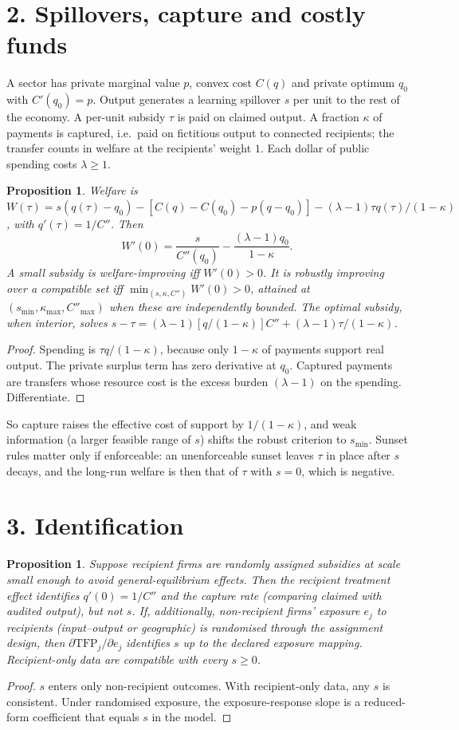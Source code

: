 \documentclass[11pt]{article}
\newtheorem{proposition}[theorem]{Proposition}
\theoremstyle{definition}
\begin{document}
\section*{2. Spillovers, capture and costly funds}
A sector has private marginal value $p$, convex cost $C(q)$ and private optimum $q_0$ with $C'(q_0)=p$. Output generates a
learning spillover $s$ per unit to the rest of the economy. A per-unit subsidy $\tau$ is paid on claimed output. A fraction
$\kappa$ of payments is captured, i.e.\ paid on fictitious output to connected recipients; the transfer counts in welfare at
the recipients' weight $1$. Each dollar of public spending costs $\lambda\ge1$.
\begin{proposition}\label{prop:thr}
Welfare is
$W(\tau)=s(q(\tau)-q_0)-[C(q)-C(q_0)-p(q-q_0)]-(\lambda-1)\tau q(\tau)/(1-\kappa)$, with $q'(\tau)=1/C''$. Then
\[
 W'(0)=\frac{s}{C''(q_0)}-\frac{(\lambda-1)q_0}{1-\kappa}.
\]
A small subsidy is welfare-improving iff $W'(0)>0$. It is robustly improving over a compatible set iff
$\min_{(s,\kappa,C'')}W'(0)>0$, attained at $(s_{\min},\kappa_{\max},C''_{\max})$ when these are independently bounded.
The optimal subsidy, when interior, solves $s-\tau=(\lambda-1)[q/(1-\kappa)]C''+(\lambda-1)\tau/(1-\kappa)$.
\end{proposition}
\begin{proof}
Spending is $\tau q/(1-\kappa)$, because only $1-\kappa$ of payments support real output. The private surplus term has zero
derivative at $q_0$. Captured payments are transfers whose resource cost is the excess burden $(\lambda-1)$ on the
spending. Differentiate.
\end{proof}
So capture raises the effective cost of support by $1/(1-\kappa)$, and weak information (a larger feasible range of
$s$) shifts the robust criterion to $s_{\min}$. Sunset rules matter only if enforceable: an unenforceable sunset
leaves $\tau$ in place after $s$ decays, and the long-run welfare is then that of $\tau$ with $s=0$, which is negative.

\section*{3. Identification}
\begin{proposition}\label{prop:id}
Suppose recipient firms are randomly assigned subsidies at scale small enough to avoid general-equilibrium effects. Then
the recipient treatment effect identifies $q'(0)=1/C''$ and the capture rate (comparing claimed with audited output),
but not $s$. If, additionally, non-recipient firms' exposure $e_j$ to recipients (input--output or geographic) is
randomised through the assignment design, then $\partial\mathrm{TFP}_j/\partial e_j$ identifies $s$ up to the declared exposure
mapping. Recipient-only data are compatible with every $s\ge0$.
\end{proposition}
\begin{proof}
$s$ enters only non-recipient outcomes. With recipient-only data, any $s$ is consistent. Under randomised exposure, the
exposure-response slope is a reduced-form coefficient that equals $s$ in the model.
\end{proof}
\end{document}

